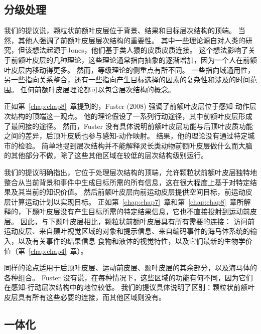 \subsection{分级处理}

我们的提议说，颗粒状前额叶皮层位于背景、结果和目标层次结构的顶端。
当然，其他人强调了前额叶皮层层次结构的重要性。
其中一些理论源自对人类的研究\cite{koechlin2003architecture,badre2008cognitive}，但该想法起源于Jones\cite{jones1970anatomical}，他们基于类人猿的皮质皮质连接。
这个想法影响了关于前额叶皮层的几种理论，这些理论通常指向抽象的逐渐增加，因为一个人在前额叶皮层内移动得更多\cite{badre2008cognitive}。
然而，等级理论的侧重点有所不同。
一些指向域通用性\cite{wilson2010functional}，另一些指向关系整合\cite{wendelken2008brain}，还有一些指向产生目标选择的因素的复杂性和涉及的时间范围\cite{summerfield2009decision}。
任何前额叶皮层理论都可以包含层次结构的概念。
\par


正如第~\ref{chap:chap8}~章提到的，Fuster (2008) 强调了前额叶皮层位于感知-动作层次结构的顶端这一观点。
他的理论假设了一系列行动途径，其中前额叶皮层形成了最间接的途径。
然而，Fuster 没有具体说明前额叶皮层功能与后顶叶皮质功能之间的差异，后顶叶皮质也参与感知-动作映射。
结果，他的理论没有通过特定城市的检验。
简单地提到层次结构并不能解释灵长类动物前额叶皮层做什么而大脑的其他部分不做，除了这些其他区域在较低的层次结构级别运行。
\par


我们的提议明确指出，它位于处理层次结构的顶端，允许颗粒状前额叶皮层独特地整合从当前背景和事件中生成目标所需的所有信息，这在很大程度上基于对特定结果及其当前的知识价值。
然后前额叶皮层向前运动皮层提供空间目标，前运动皮层计算运动计划以实现目标。
正如第~\ref{chap:chap7}~章和第~\ref{chap:chap8}~章所解释的，下颞叶皮层没有产生目标所需的特定结果信息，它也不直接投射到运动前皮层。
因此，与下颞叶皮层相比，颗粒状前额叶皮层具有所有需要的连接：
访问前运动皮层、来自颞叶视觉区域的对象和提示信息、来自编码事件的海马体系统的输入，以及有关事件的结果信息 食物和液体的视觉特性，以及它们最新的生物学价值（第~\ref{chap:chap4}~章）。
\par


同样的论点适用于后顶叶皮层、运动前皮层、颞叶皮层的其余部分，以及海马体的各种组合。
Fuster 没有说，在每种情况下，这些区域的功能有何不同，因为它们在感知-行动层次结构中的地位较低。
我们的提议具体说明了区别：颗粒状前额叶皮层具有所有这些必要的连接，而其他区域则没有。



\subsection{一体化}

